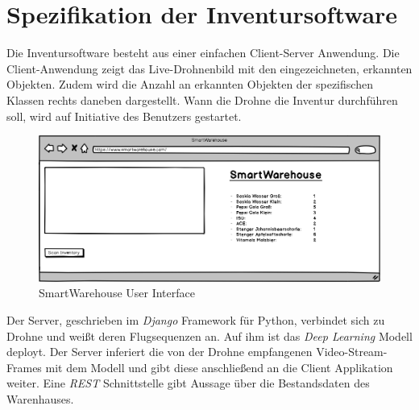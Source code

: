 \section{Spezifikation der Inventursoftware}

Die Inventursoftware besteht aus einer einfachen Client-Server Anwendung. Die Client-Anwendung zeigt das Live-Drohnenbild mit den eingezeichneten, erkannten Objekten. Zudem wird die Anzahl an erkannten Objekten der spezifischen Klassen rechts daneben dargestellt. Wann die Drohne die Inventur durchführen soll, wird auf Initiative des Benutzers gestartet. 

\begin{figure}[ht]
	\begin{center}
		\includegraphics[width=15cm]{Bilder/UI.png} 
		\caption[SmartWarehouse User Interface]{SmartWarehouse User Interface}
		\label{ui}
	\end{center}
\end{figure}

Der Server, geschrieben im \textit{Django} Framework für Python, verbindet sich zu Drohne und weißt deren Flugsequenzen an. Auf ihm ist das \textit{Deep Learning} Modell deployt. Der Server inferiert die von der Drohne empfangenen Video-Stream-Frames mit dem Modell und gibt diese anschließend an die Client Applikation weiter. Eine \textit{REST} Schnittstelle gibt Aussage über die Bestandsdaten des Warenhauses.